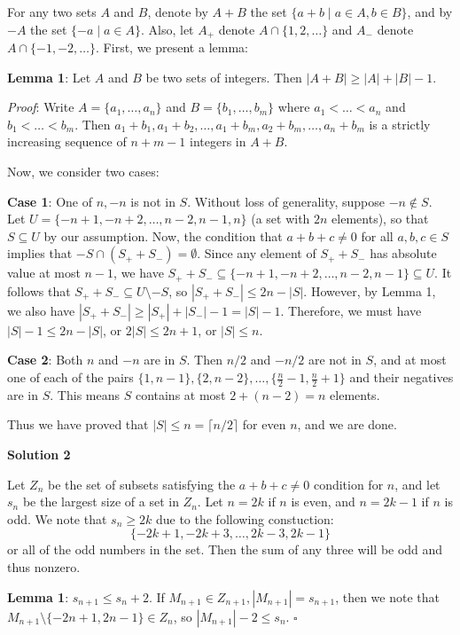 \begin{enumerate}
 For any two sets $A$ and $B$, denote by $A+B$ the set $\{a+b\mid a\in A,b\in B\}$, and by $-A$ the set $\{-a\mid a\in A\}$. Also, let $A_+$ denote $A\cap\{1,2,\dots\}$ and $A_-$ denote $A\cap\{-1,-2,\dots\}$. First, we present a lemma:

 \textbf{Lemma 1}: Let $A$ and $B$ be two sets of integers. Then $|A+B|\geq|A|+|B|-1$.

 \textit{Proof}: Write $A=\{a_1,\dots,a_n\}$ and $B=\{b_1,\dots,b_m\}$ where $a_1<\dots<a_n$ and $b_1<\dots<b_m$. Then $a_1+b_1,a_1+b_2,\dots,a_1+b_m,a_2+b_m,\dots,a_n+b_m$ is a strictly increasing sequence of $n+m-1$ integers in $A+B$.

 Now, we consider two cases:

 \textbf{Case 1}: One of $n,-n$ is not in $S$. Without loss of generality, suppose $-n\notin S$. Let $U=\{-n+1,-n+2,\dots,n-2,n-1,n\}$ (a set with $2n$ elements), so that $S\subseteq U$ by our assumption. Now, the condition that $a+b+c\neq 0$ for all $a,b,c\in S$ implies that $-S\cap(S_++S_-)=\emptyset$. Since any element of $S_++S_-$ has absolute value at most $n-1$, we have $S_++S_-\subseteq \{-n+1,-n+2,\dots,n-2,n-1\}\subseteq U$. It follows that $S_++S_-\subseteq U\setminus -S$, so $|S_++S_-|\leq 2n-|S|$. However, by Lemma 1, we also have $|S_++S_-|\geq |S_+|+|S_-|-1=|S|-1$.  Therefore, we must have $|S|-1\leq 2n-|S|$, or $2|S|\leq 2n+1$, or $|S|\leq n$.

 \textbf{Case 2}: Both $n$ and $-n$ are in $S$. Then $n/2$ and $-n/2$ are not in $S$, and at most one of each of the pairs $\{1,n-1\},\{2,n-2\},\ldots,\{\frac n2-1,\frac n2+1\}$ and their negatives are in $S$. This means $S$ contains at most $2+(n-2)=n$ elements.

 Thus we have proved that $|S|\leq n=\lceil n/2\rceil$ for even $n$, and we are done.

 



\textbf{Solution 2}

Let $Z_n$ be the set of subsets satisfying the $a+b+c \neq 0$ condition for $n$, and let $s_n$ be the largest size of a set in $Z_n$. Let $n = 2k$ if $n$ is even, and $n = 2k-1$ if $n$ is odd. We note that $s_n \ge 2k$ due to the following constuction: 
 \[\{-2k+1, -2k + 3, \ldots, 2k-3, 2k-1\}\] or all of the odd numbers in the set. Then the sum of any three will be odd and thus nonzero. 

 
\textbf{Lemma 1}: $s_{n+1} \le s_{n} + 2$. If $M_{n+1} \in Z_{n+1}, |M_{n+1}| = s_{n+1}$, then we note that $M_{n+1} \setminus \{-2n+1, 2n-1\} \in Z_n$, so $|M_{n+1}| - 2 \le s_n$. $\square$


\end{enumerate}
